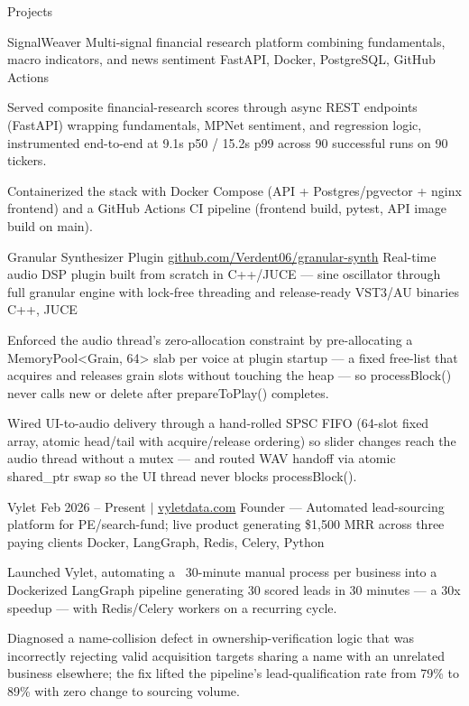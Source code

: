 \documentclass[
	11pt
]{../../../template}
\begin{document}
	\begin{rSection}{P}{rojects}
		\begin{rSectionEntry}
			{SignalWeaver}
			{}
			{Multi-signal financial research platform combining fundamentals, macro indicators, and news sentiment}
			{FastAPI, Docker, PostgreSQL, GitHub Actions}
			{}

			\item Served composite financial-research scores through async REST endpoints (FastAPI) wrapping fundamentals, MPNet sentiment, and regression logic, instrumented end-to-end at 9.1s p50 / 15.2s p99 across 90 successful runs on 90 tickers.
			\item Containerized the stack with Docker Compose (API + Postgres/pgvector + nginx frontend) and a GitHub Actions CI pipeline (frontend build, pytest, API image build on main).
		\end{rSectionEntry}

		\begin{rSectionEntry}
			{Granular Synthesizer Plugin}
			{\href{https://github.com/Verdent06/granular-synth}{github.com/Verdent06/granular-synth}}
			{Real-time audio DSP plugin built from scratch in C++/JUCE --- sine oscillator through full granular engine with lock-free threading and release-ready VST3/AU binaries}
			{C++, JUCE}
			{}

			\item Enforced the audio thread's zero-allocation constraint by pre-allocating a MemoryPool<Grain, 64> slab per voice at plugin startup --- a fixed free-list that acquires and releases grain slots without touching the heap --- so processBlock() never calls new or delete after prepareToPlay() completes.
			\item Wired UI-to-audio delivery through a hand-rolled SPSC FIFO (64-slot fixed array, atomic head/tail with acquire/release ordering) so slider changes reach the audio thread without a mutex --- and routed WAV handoff via atomic shared\_ptr swap so the UI thread never blocks processBlock().
		\end{rSectionEntry}

		\begin{rSectionEntry}
			{Vylet}
			{Feb 2026 -- Present $\vert$ \href{https://vyletdata.com}{vyletdata.com}}
			{Founder --- Automated lead-sourcing platform for PE/search-fund; live product generating \$1,500 MRR across three paying clients}
			{Docker, LangGraph, Redis, Celery, Python}
			{}

			\item Launched Vylet, automating a ~30-minute manual process per business into a Dockerized LangGraph pipeline generating 30 scored leads in 30 minutes --- a 30x speedup --- with Redis/Celery workers on a recurring cycle.
			\item Diagnosed a name-collision defect in ownership-verification logic that was incorrectly rejecting valid acquisition targets sharing a name with an unrelated business elsewhere; the fix lifted the pipeline's lead-qualification rate from 79\% to 89\% with zero change to sourcing volume.
		\end{rSectionEntry}
	\end{rSection}
\end{document}
